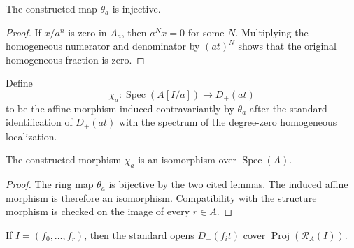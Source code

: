 \begin{lemma}
  \label{lemma:nagata-homogeneous-away-to-chart-injective}

  The constructed map $\theta_a$ is injective.
\end{lemma}

\begin{proof}
  If $x/a^n$ is zero in $A_a$, then $a^N x=0$ for some $N$.  Multiplying the
  homogeneous numerator and denominator by $(at)^N$ shows that the original
  homogeneous fraction is zero.
\end{proof}

\begin{definition}
  \label{def:nagata-affine-blowup-chart-map}

  Define
  \[
    \chi_a\colon \operatorname{Spec}(A[I/a])\longrightarrow D_+(at)
  \]
  to be the affine morphism induced contravariantly by $\theta_a$ after the
  standard identification of $D_+(at)$ with the spectrum of the degree-zero
  homogeneous localization.
\end{definition}

\begin{proposition}
  \label{prop:nagata-affine-blowup-chart}

  The constructed morphism $\chi_a$ is an isomorphism over
  $\operatorname{Spec}(A)$.
\end{proposition}

\begin{proof}
  The ring map $\theta_a$ is bijective by the two cited lemmas.  The induced
  affine morphism is therefore an isomorphism.  Compatibility with the
  structure morphism is checked on the image of every $r\in A$.
\end{proof}

\begin{lemma}
  \label{lemma:nagata-rees-generators-cover-proj}

  If $I=(f_0,\ldots,f_r)$, then the standard opens
  $D_+(f_it)$ cover $\operatorname{Proj}(\mathcal R_A(I))$.
\end{lemma}

